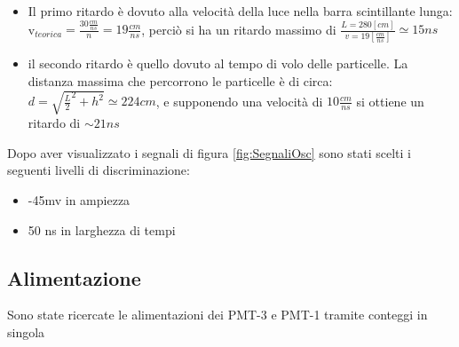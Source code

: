 \documentclass[a4paper]{article}
\begin{document}
\begin{itemize}
\item Il primo ritardo è dovuto alla velocità della luce nella barra scintillante lunga: v$_{teorica} = \frac{30\frac{cm}{ns}}{n} = 19 \frac{cm}{ns}$, perciò si ha un ritardo massimo di $\frac{L = 280 [cm]}{v = 19 [\frac{cm}{ns}]} \simeq 15 ns$
\item il secondo ritardo è quello dovuto al tempo di volo delle particelle. La distanza massima che percorrono le particelle è di circa: $d = \sqrt{\frac{L}{2}^2 + h^2} \simeq 224 cm$, e supponendo una velocità di $10\frac{cm}{ns}$ si ottiene un ritardo di $\sim 21 ns$
\end{itemize}

Dopo aver visualizzato i segnali di figura \ref{fig:SegnaliOsc} sono stati scelti i seguenti livelli di discriminazione:

\begin{itemize}
\item -45mv in ampiezza
\item 50 ns in larghezza di tempi
\end{itemize}

\subsection{Alimentazione}
\label{sec:CalSin}
Sono state ricercate le alimentazioni dei PMT-3 e PMT-1 tramite conteggi in singola
\end{document}
